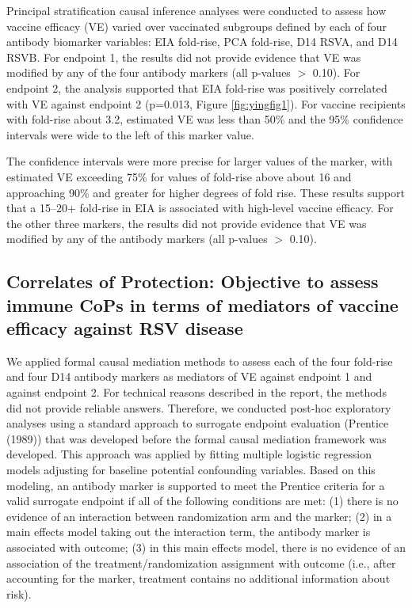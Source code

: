 \documentclass[11pt]{article}
\begin{document}
Principal stratification causal inference analyses were conducted to assess how vaccine efficacy (VE) varied over vaccinated subgroups defined by each of four antibody biomarker variables: EIA fold-rise, PCA fold-rise, D14 RSVA, and D14 RSVB. For endpoint 1, the results did not provide evidence that VE was modified by any of the four antibody markers (all p-values \(>\) 0.10). For endpoint 2, the analysis supported that EIA fold-rise was positively correlated with VE against endpoint 2 (p=0.013,
Figure \ref{fig:yingfig1}). For vaccine recipients with fold-rise about 3.2, estimated VE was less than 50\% and the 95\% confidence intervals were wide to the left of this marker value.

The confidence intervals were more precise for larger values of the marker, with estimated VE exceeding 75\% for values of fold-rise above about 16 and approaching 90\% and greater for higher degrees of fold rise. These results support that a 15--20+ fold-rise in EIA is associated with high-level vaccine efficacy. For the other three markers, the results did not provide evidence that VE was modified by any of the antibody markers (all p-values \(>\) 0.10).

\hypertarget{correlates-of-protection-objective-to-assess-immune-cops-in-terms-of-mediators-of-vaccine-efficacy-against-rsv-disease}{%
\subsection{Correlates of Protection: Objective to assess immune CoPs in terms of mediators of vaccine efficacy against RSV disease}\label{correlates-of-protection-objective-to-assess-immune-cops-in-terms-of-mediators-of-vaccine-efficacy-against-rsv-disease}}

We applied formal causal mediation methods to assess each of the four fold-rise and four D14 antibody markers as mediators of VE against endpoint 1 and against endpoint 2. For technical reasons described in the report, the methods did not provide reliable answers. Therefore, we conducted post-hoc exploratory analyses using a standard approach to surrogate endpoint evaluation (Prentice (1989)) that was developed before the formal causal mediation framework was developed. This approach was applied by fitting multiple logistic regression models adjusting for baseline potential confounding variables. Based on this modeling, an antibody marker is supported to meet the Prentice criteria for a valid surrogate endpoint if all of the following conditions are met: (1) there is no evidence of an interaction between randomization arm and the marker; (2) in a main effects model taking out the interaction term, the antibody marker is associated with outcome; (3) in this main effects model, there is no evidence of an association of the treatment/randomization assignment with outcome (i.e., after accounting for the marker, treatment contains no additional information about risk).
\end{document}

